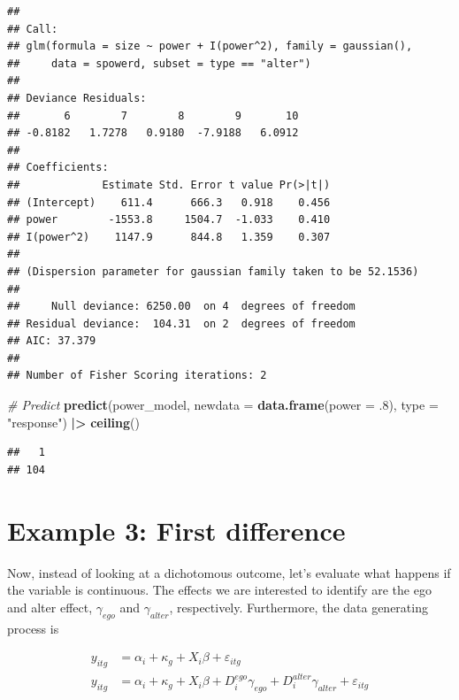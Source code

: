\documentclass[
]{book}
\newenvironment{Shaded}{\begin{snugshade}}{\end{snugshade}}
\newcommand{\AttributeTok}[1]{\textcolor[rgb]{0.13,0.29,0.53}{#1}}
\newcommand{\CommentTok}[1]{\textcolor[rgb]{0.56,0.35,0.01}{\textit{#1}}}
\newcommand{\DecValTok}[1]{\textcolor[rgb]{0.00,0.00,0.81}{#1}}
\newcommand{\FunctionTok}[1]{\textcolor[rgb]{0.13,0.29,0.53}{\textbf{#1}}}
\newcommand{\NormalTok}[1]{#1}
\newcommand{\SpecialCharTok}[1]{\textcolor[rgb]{0.81,0.36,0.00}{\textbf{#1}}}
\newcommand{\StringTok}[1]{\textcolor[rgb]{0.31,0.60,0.02}{#1}}
\begin{document}
\begin{verbatim}
## 
## Call:
## glm(formula = size ~ power + I(power^2), family = gaussian(), 
##     data = spowerd, subset = type == "alter")
## 
## Deviance Residuals: 
##       6        7        8        9       10  
## -0.8182   1.7278   0.9180  -7.9188   6.0912  
## 
## Coefficients:
##             Estimate Std. Error t value Pr(>|t|)
## (Intercept)    611.4      666.3   0.918    0.456
## power        -1553.8     1504.7  -1.033    0.410
## I(power^2)    1147.9      844.8   1.359    0.307
## 
## (Dispersion parameter for gaussian family taken to be 52.1536)
## 
##     Null deviance: 6250.00  on 4  degrees of freedom
## Residual deviance:  104.31  on 2  degrees of freedom
## AIC: 37.379
## 
## Number of Fisher Scoring iterations: 2
\end{verbatim}

\begin{Shaded}
\begin{Highlighting}[]
\CommentTok{\# Predict}
\FunctionTok{predict}\NormalTok{(power\_model, }\AttributeTok{newdata =} \FunctionTok{data.frame}\NormalTok{(}\AttributeTok{power =}\NormalTok{ .}\DecValTok{8}\NormalTok{), }\AttributeTok{type =} \StringTok{"response"}\NormalTok{) }\SpecialCharTok{|\textgreater{}}
  \FunctionTok{ceiling}\NormalTok{()}
\end{Highlighting}
\end{Shaded}

\begin{verbatim}
##   1 
## 104
\end{verbatim}

\hypertarget{example-3-first-difference}{%
\section{Example 3: First difference}\label{example-3-first-difference}}

Now, instead of looking at a dichotomous outcome, let's evaluate what happens if
the variable is continuous. The effects we are interested to identify are the ego and alter effect, \(\gamma_{ego}\) and \(\gamma_{alter}\), respectively. Furthermore, the data generating process is

\begin{align*}
y_{itg} & = \alpha_i + \kappa_g + X_i\beta + \varepsilon_{itg} \\
y_{itg} & = \alpha_i + \kappa_g + X_i\beta + D_{i}^{ego}\gamma_{ego} + D_i^{alter}\gamma_{alter} + \varepsilon_{itg}
\end{align*}
\end{document}
